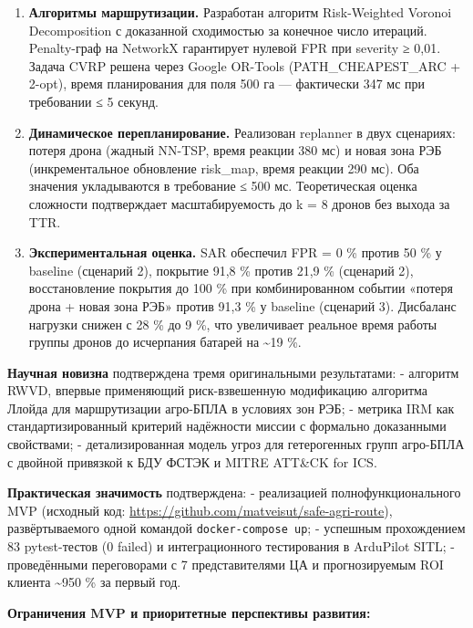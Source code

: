 \begin{enumerate}
\item
  \textbf{Алгоритмы маршрутизации.} Разработан алгоритм Risk-Weighted Voronoi Decomposition с доказанной сходимостью за конечное число итераций. Penalty-граф на NetworkX гарантирует нулевой FPR при severity ≥ 0,01. Задача CVRP решена через Google OR-Tools (PATH\_CHEAPEST\_ARC + 2-opt), время планирования для поля 500 га --- фактически 347 мс при требовании ≤ 5 секунд.
\item
  \textbf{Динамическое перепланирование.} Реализован replanner в двух сценариях: потеря дрона (жадный NN-TSP, время реакции 380 мс) и новая зона РЭБ (инкрементальное обновление risk\_map, время реакции 290 мс). Оба значения укладываются в требование ≤ 500 мс. Теоретическая оценка сложности подтверждает масштабируемость до k = 8 дронов без выхода за TTR.
\item
  \textbf{Экспериментальная оценка.} SAR обеспечил FPR = 0 \% против 50 \% у baseline (сценарий 2), покрытие 91,8 \% против 21,9 \% (сценарий 2), восстановление покрытия до 100 \% при комбинированном событии «потеря дрона + новая зона РЭБ» против 91,3 \% у baseline (сценарий 3). Дисбаланс нагрузки снижен с 28 \% до 9 \%, что увеличивает реальное время работы группы дронов до исчерпания батарей на \textasciitilde19 \%.
\end{enumerate}

\textbf{Научная новизна} подтверждена тремя оригинальными результатами: - алгоритм RWVD, впервые применяющий риск-взвешенную модификацию алгоритма Ллойда для маршрутизации агро-БПЛА в условиях зон РЭБ; - метрика IRM как стандартизированный критерий надёжности миссии с формально доказанными свойствами; - детализированная модель угроз для гетерогенных групп агро-БПЛА с двойной привязкой к БДУ ФСТЭК и MITRE ATT\&CK for ICS.

\textbf{Практическая значимость} подтверждена: - реализацией полнофункционального MVP (исходный код: \url{https://github.com/matveisut/safe-agri-route}), развёртываемого одной командой \texttt{docker-compose\ up}; - успешным прохождением 83 pytest-тестов (0 failed) и интеграционного тестирования в ArduPilot SITL; - проведёнными переговорами с 7 представителями ЦА и прогнозируемым ROI клиента \textasciitilde950 \% за первый год.

\textbf{Ограничения MVP и приоритетные перспективы развития:}

